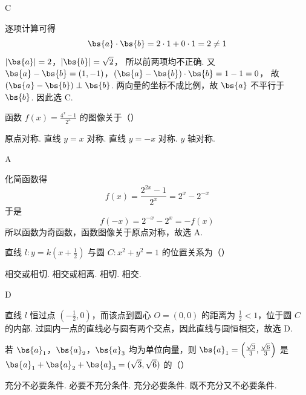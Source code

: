 \begin{answer}
C
\end{answer}

\begin{solution}
逐项计算可得
\[
\bs{a}\cdot\bs{b}=2\cdot1+0\cdot1=2\ne1
\]
\(|\bs{a}|=2\)，\(|\bs{b}|=\sqrt{2}\)，
所以前两项均不正确. 又
\(\bs{a}-\bs{b}=(1,-1)\)，\((\bs{a}-\bs{b})\cdot\bs{b}=1-1=0\)，
故 \((\bs{a}-\bs{b})\perp\bs{b}\). 两向量的坐标不成比例，故 \(\bs{a}\) 不平行于 \(\bs{b}\). 因此选 C.
\end{solution}

\begin{problem}
函数 \( f(x) = \frac{4^x - 1}{2^x} \) 的图像关于（\quad）

\choices
    {原点对称.}
    {直线 \(y=x\) 对称.}
    {直线 \(y=-x\) 对称.}
    {\(y\) 轴对称.}
\end{problem}

\begin{answer}
A
\end{answer}

\begin{solution}
化简函数得
\[
f(x)=\frac{2^{2x}-1}{2^x}=2^x-2^{-x}
\]
于是
\[
f(-x)=2^{-x}-2^x=-f(x)
\]
所以函数为奇函数，函数图像关于原点对称，故选 A.
\end{solution}

\begin{problem}
直线 \(l: y = k\left(x + \frac{1}{2}\right)\) 与圆 \(C: x^2 + y^2 = 1\) 的位置关系为（\quad）

\choices
    {相交或相切.}
    {相交或相离.}
    {相切.}
    {相交.}
\end{problem}

\begin{answer}
D
\end{answer}

\begin{solution}
直线 \(l\) 恒过点 \(\left(-\frac12,0\right)\)，而该点到圆心 \(O=(0,0)\) 的距离为 \(\frac12<1\)，位于圆 \(C\) 的内部. 过圆内一点的直线必与圆有两个交点，因此直线与圆恒相交，故选 D.
\end{solution}

\begin{problem}
若 \(\bs{a}_1\)，\(\bs{a}_2\)，\(\bs{a}_3\) 均为单位向量，则 \(\bs{a}_1 = \left(\frac{\sqrt{3}}{3}, \frac{\sqrt{6}}{3}\right)\) 是 \(\bs{a}_1 + \bs{a}_2 + \bs{a}_3 = (\sqrt{3}, \sqrt{6})\) 的（\quad）

\choices
    {充分不必要条件.}
    {必要不充分条件.}
    {充分必要条件.}
    {既不充分又不必要条件.}
\end{problem}

